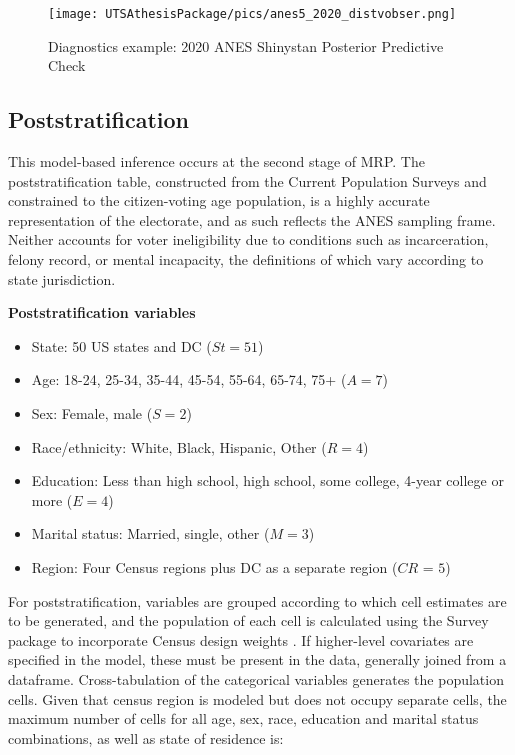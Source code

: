 \begin{figure}[ht]
\texttt{[image: UTSAthesisPackage/pics/anes5\_2020\_distvobser.png]}
\caption{Diagnostics example: 2020 ANES Shinystan Posterior Predictive Check}
\label{fig:anes2020ppe}
\end{figure}


\subsection{Poststratification}

This model-based inference occurs at the second stage of MRP. The poststratification table, constructed from the Current Population Surveys and constrained to the citizen-voting age population, is a highly accurate representation of the electorate, and as such reflects the ANES sampling frame. Neither accounts for voter ineligibility due to conditions such as incarceration, felony record, or mental incapacity, the definitions of which vary according to state jurisdiction. 

\vspace{.5 cm}
\textbf{Poststratification variables}
\begin{itemize}
    \item  State: 50 US states and DC ($St = 51$)
    \item  Age: 18-24, 25-34, 35-44, 45-54, 55-64, 65-74, 75+ ($A = 7$)  
    \item  Sex: Female, male ($S = 2$)
    \item  Race/ethnicity: White, Black, Hispanic, Other ($R = 4$)
    \item  Education: Less than high school, high school, some college, 4-year college or more ($E = 4$)
    \item Marital status: Married, single, other ($M = 3$)
    \item Region: Four Census regions plus DC as a separate region ($CR$ = $5$)
\end{itemize}
\vspace{.5cm}


\noindent For poststratification, variables are grouped according to which cell estimates are to be generated, and the population of each cell is calculated using the Survey package to incorporate Census design weights \citep{lumley_survey_2020}. If higher-level covariates are specified in the model, these must be present in the data, generally joined from a dataframe. Cross-tabulation of the categorical variables generates the population cells. Given that census region is modeled but does not occupy separate cells, the maximum number of cells for all age, sex, race, education and marital status combinations, as well as state of residence is:

